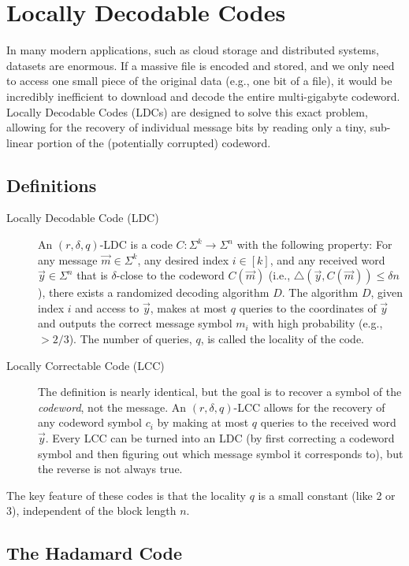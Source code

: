 
\section{Locally Decodable Codes}

In many modern applications, such as cloud storage and distributed systems, datasets are enormous. If a massive file is encoded and stored, and we only need to access one small piece of the original data (e.g., one bit of a file), it would be incredibly inefficient to download and decode the entire multi-gigabyte codeword. Locally Decodable Codes (LDCs) are designed to solve this exact problem, allowing for the recovery of individual message bits by reading only a tiny, sub-linear portion of the (potentially corrupted) codeword.

\subsection{Definitions}

\begin{description}
    \item[Locally Decodable Code (LDC)] An $(r, \delta, q)$-LDC is a code $C: \Sigma^k \to \Sigma^n$ with the following property: For any message $\vec{m} \in \Sigma^k$, any desired index $i \in [k]$, and any received word $\vec{y} \in \Sigma^n$ that is $\delta$-close to the codeword $C(\vec{m})$ (i.e., $\triangle(\vec{y}, C(\vec{m})) \le \delta n$), there exists a randomized decoding algorithm $D$. The algorithm $D$, given index $i$ and access to $\vec{y}$, makes at most $q$ queries to the coordinates of $\vec{y}$ and outputs the correct message symbol $m_i$ with high probability (e.g., $> 2/3$). The number of queries, $q$, is called the locality of the code.

    \item[Locally Correctable Code (LCC)] The definition is nearly identical, but the goal is to recover a symbol of the \textit{codeword}, not the message. An $(r, \delta, q)$-LCC allows for the recovery of any codeword symbol $c_i$ by making at most $q$ queries to the received word $\vec{y}$. Every LCC can be turned into an LDC (by first correcting a codeword symbol and then figuring out which message symbol it corresponds to), but the reverse is not always true.
\end{description}
The key feature of these codes is that the locality $q$ is a small constant (like 2 or 3), independent of the block length $n$.

\subsection{The Hadamard Code}

